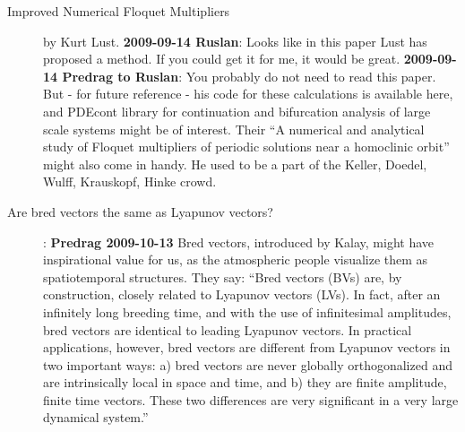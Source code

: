 \begin{description}
\item[Improved Numerical Floquet
Multipliers] by
     {Kurt Lust}.  {\bf 2009-09-14 Ruslan}:
Looks like  in this paper {Lust} has proposed a method. If you
could get it for me, it would be great. {\bf 2009-09-14 Predrag
to Ruslan}: You probably do not need to read this paper.
But - for future reference - his
     code for these calculations is
     {available here}, and
     {PDEcont library}  for continuation and bifurcation analysis
      of large scale systems might be of interest.
Their ``A numerical and analytical study of Floquet
        multipliers of periodic solutions near
        a homoclinic orbit''
might also come in handy.
He used to be a part of the Keller, Doedel, Wulff, Krauskopf,
Hinke crowd.


\item[Are bred vectors the same as
    {L}yapunov vectors?]: {\bf Predrag
2009-10-13} Bred vectors, introduced by Kalay, might have
inspirational value for us, as the atmospheric people
visualize them as spatiotemporal structures. They say:
    ``Bred vectors (BVs) are, by construction, closely
related to Lyapunov vectors (LVs). In fact, after an
infinitely long breeding time, and with the use of
infinitesimal amplitudes, bred vectors are identical to
leading Lyapunov vectors. In practical applications,
however, bred vectors are different from Lyapunov
vectors in two important ways: a) bred vectors are
never globally orthogonalized and are intrinsically
local in space and time, and b) they are finite
amplitude, finite time vectors. These two differences
are very significant in a very large dynamical system.''



\end{description}
